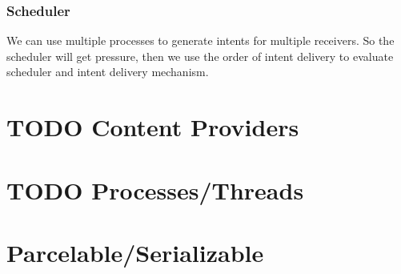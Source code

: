 \documentclass[11pt]{article}
\begin{document}
\subsubsection{Scheduler}
\label{sec-3-2-3}
We can use multiple processes to generate intents for multiple receivers.
So the scheduler will get pressure, then we use the order of intent delivery
to evaluate scheduler and intent delivery mechanism.

\section{{\bfseries\sffamily TODO} Content Providers}
\label{sec-4}
\section{{\bfseries\sffamily TODO} Processes/Threads}
\label{sec-5}
\section{Parcelable/Serializable}
\label{sec-6}
\end{document}
